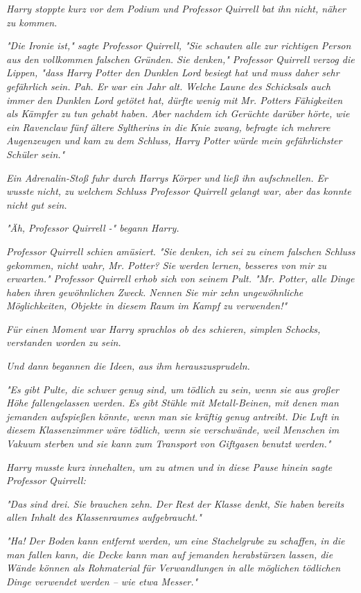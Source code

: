 {\emph{Harry stoppte kurz vor dem Podium und Professor Quirrell bat ihn nicht, näher zu kommen.}

\emph{"Die Ironie ist," sagte Professor Quirrell, "Sie schauten alle zur richtigen Person aus den vollkommen falschen Gründen. Sie denken," Professor Quirrell verzog die Lippen, "dass Harry Potter den Dunklen Lord besiegt hat und muss daher sehr gefährlich sein. Pah. Er war ein Jahr alt. Welche Laune des Schicksals auch immer den Dunklen Lord getötet hat, dürfte wenig mit Mr. Potters Fähigkeiten als Kämpfer zu tun gehabt haben. Aber nachdem ich Gerüchte darüber hörte, wie ein Ravenclaw fünf ältere Syltherins in die Knie zwang, befragte ich mehrere Augenzeugen und kam zu dem Schluss, Harry Potter würde mein gefährlichster Schüler sein."}

\emph{Ein Adrenalin-Stoß fuhr durch Harrys Körper und ließ ihn aufschnellen. Er wusste nicht, zu welchem Schluss Professor Quirrell gelangt war, aber das konnte nicht gut sein.}

\emph{"Äh, Professor Quirrell -" begann Harry.}

\emph{Professor Quirrell schien amüsiert. "Sie denken, ich sei zu einem falschen Schluss gekommen, nicht wahr, Mr. Potter? Sie werden lernen, besseres von} \emph{\emph{mir}} \emph{zu erwarten." Professor Quirrell erhob sich von seinem Pult. "Mr. Potter, alle Dinge haben ihren gewöhnlichen Zweck. Nennen Sie mir zehn ungewöhnliche Möglichkeiten, Objekte in diesem Raum im Kampf zu verwenden!"}

\emph{Für einen Moment war Harry sprachlos ob des schieren, simplen Schocks, verstanden worden zu sein.}

\emph{Und dann begannen die Ideen, aus ihm herauszusprudeln.}

\emph{"Es gibt Pulte, die schwer genug sind, um tödlich zu sein, wenn sie aus großer Höhe fallengelassen werden. Es gibt Stühle mit Metall-Beinen, mit denen man jemanden aufspießen könnte, wenn man sie kräftig genug antreibt. Die Luft in diesem Klassenzimmer wäre tödlich, wenn sie verschwände, weil Menschen im Vakuum sterben und sie kann zum Transport von Giftgasen benutzt werden."}

\emph{Harry musste kurz innehalten, um zu atmen und in diese Pause hinein sagte Professor Quirrell:}

\emph{"Das sind drei. Sie brauchen zehn. Der Rest der Klasse denkt, Sie haben bereits allen Inhalt des Klassenraumes aufgebraucht."}

\emph{"\emph{Ha!}} \emph{Der Boden kann entfernt werden, um eine Stachelgrube zu schaffen, in die man fallen kann, die Decke kann man auf jemanden herabstürzen lassen, die Wände können als Rohmaterial für Verwandlungen in alle möglichen tödlichen Dinge verwendet werden -- wie etwa Messer."}

}
